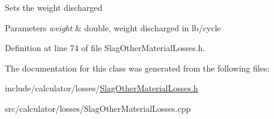 Sets the weight discharged


\begin{DoxyParams}{Parameters}
{\em weight} & double, weight discharged in lb/cycle \\
\hline
\end{DoxyParams}


Definition at line 74 of file Slag\+Other\+Material\+Losses.\+h.



The documentation for this class was generated from the following files\+:\begin{DoxyCompactItemize}
\item 
include/calculator/losses/\hyperlink{_slag_other_material_losses_8h}{Slag\+Other\+Material\+Losses.\+h}\item 
src/calculator/losses/Slag\+Other\+Material\+Losses.\+cpp\end{DoxyCompactItemize}
